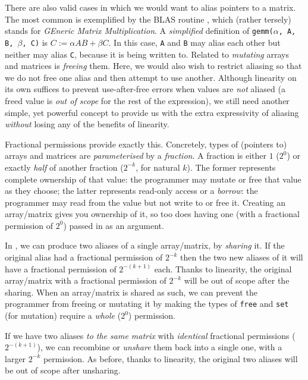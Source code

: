 There are also valid cases in which we would want to alias pointers to a
matrix. The most common is exemplified by the BLAS routine , which
(rather tersely) stands for \emph{GEneric Matrix Multiplication}.  A
\emph{simplified} definition of \texttt{gemm($\alpha$, A, B, $\beta$, C)} is $C
:= \alpha AB + \beta C$. In this case, \texttt{A} and \texttt{B} may alias each
other but neither may alias \texttt{C}, because it is being written to.
Related to \emph{mutating} arrays and matrices is \emph{freeing} them. Here, we
would also wish to restrict aliasing so that we do not free one alias and then
attempt to use another. Although linearity on its own suffices to prevent
use-after-free errors when values are \emph{not} aliased (a freed value is
\emph{out of scope} for the rest of the expression), we still need another
simple, yet powerful concept to provide us with the extra expressivity of
aliasing \emph{without} losing any of the benefits of linearity.

Fractional permissions provide exactly this. Concretely, types of (pointers to)
arrays and matrices are \emph{parameterised} by a \emph{fraction}. A fraction
is either $1$ ($2^0$) or exactly \emph{half} of another fraction ($2^{-k}$, for
natural $k$). The former represents complete ownership of that value: the
programmer may mutate or free that value as they choose; the latter represents
read-only access or a \emph{borrow}: the programmer may read from the value but
not write to or free it. Creating an array/matrix gives you ownership of it, so
too does having one (with a fractional permission of $2^0$) passed in as an
argument.

In \lang, we can produce two aliases of a single array/matrix, by
\emph{sharing} it. If the original alias had a fractional permission of
$2^{-k}$ then the two new aliases of it will have a fractional permission of
$2^{-(k+1)}$ each. Thanks to linearity, the original array/matrix with a
fractional permission of $2^{-k}$ will be out of scope after the sharing.  When
an array/matrix is shared as such, we can prevent the programmer from freeing
or mutating it by making the types of \texttt{free} and \texttt{set} (for
mutation) require a \emph{whole} ($2^0$) permission.

If we have two aliases \emph{to the same matrix} with \emph{identical}
fractional permissions ($2^{-(k+1)}$), we can recombine or \emph{unshare} them
back into a single one, with a larger $2^{-k}$ permission. As before, thanks to
linearity, the original two aliases will be out of scope after unsharing.

